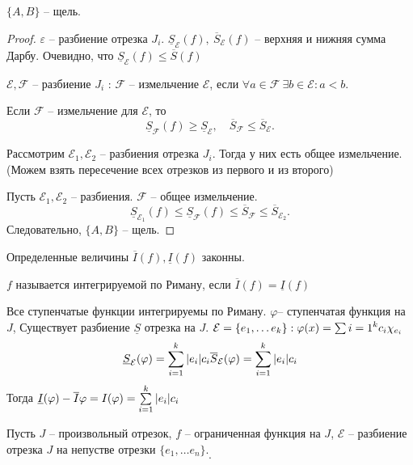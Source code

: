 \documentclass[11pt]{book}
\begin{document}
\begin{st}
    $\{A, B\}$ -- щель.
\end{st}
\begin{proof}
    $ \varepsilon $ -- разбиение отрезка $ J_i$.
    $ \underline{S}_{ \mathcal{E} } (f) , ~ \overline{S} _{ \mathcal{E} }(f)$ -- верхняя и нижняя сумма Дарбу.
    Очевидно, что $ \underline{S} _ \mathcal{E}  (f) \le  \overline{S} (f)$

    $ \mathcal{E} , \mathcal{F}$ -- разбиение  $ J_i$ : $ \mathcal{F}$ -- измельчение $ \mathcal{E} $, если $ \forall  a \in  \mathcal{F} ~ \exists  b \in  \mathcal{E} : a<b$.
    \begin{lm}
	Если $ \mathcal{F}$ -- измельчение для $ \mathcal{E} $, то \[
	    \underline{S} _\mathcal{F} (f) \ge \underline{S}_ \mathcal{E} , \quad \overline{S}_\mathcal{F} \le \overline{S}_ \mathcal{E}
	.\]
    \end{lm}
    \begin{lm}
	Рассмотрим  $ \mathcal{E}_1, \mathcal{E}_2$ -- разбиения отрезка $ J_i$.
	Тогда у них есть общее измельчение. (Можем взять пересечение всех отрезков из первого и из второго)
    \end{lm}
    Пусть $ \mathcal{E}_1, \mathcal{E}_2$ -- разбиения. $ \mathcal{F}$ -- общее измельчение.
    \[
	\underline{S}_{\mathcal{E}_1} (f) \le  \underline{S}_{\mathcal{F}} (f) \le \overline{S}_\mathcal{F} \le \overline{S}_{\mathcal{E}_2}
    .\]
    Следовательно, $ \{A, B\}$ -- щель.
\end{proof}
\begin{note}
    Определенные величины $ \overline{I}(f) , \underline{I}(f)$ законны.
\end{note}
\begin{defn}
    $ f$ называется интегрируемой по Риману, если $ \overline{I}(f) = \underline{I}(f)$
\end{defn}
\begin{ex}
\item Все ступенчатые функции интегрируемы по Риману.
    $\varphi $-- ступенчатая функция на $ J$,
    Существует разбиение $ \underline{S}$ отрезка на $ J$.
    $ \mathcal{E} = \{e_1, \ldots  e_k\} : \varphi  (x) = \sum\limits{i=1}^{k} c_i \chi_{e_i}$
    \[
	\underline{S}_{\mathcal{E}}( \varphi ) = \sum\limits_{i=1}^{k} |e_i| c_i
	\overline{S}_{\mathcal{E}}( \varphi ) = \sum\limits_{i=1}^{k} |e_i| c_i
    \]
    Тогда $ \underline{I} ( \varphi ) - \overline{I} \varphi = I( \varphi ) = \sum\limits_{i=1}^{k} |e_i| c_i$
\end{ex}
\begin{note}
    Пусть $ J$ -- произвольный отрезок, $ f$ -- ограниченная функция на $ J$, $ \mathcal{E}$ -- разбиение отрезка $ J  $ на непустве отрезки $ \{e_1, \ldots  e_n\}$.
    \[
    .\]
\end{note}
\end{document}
